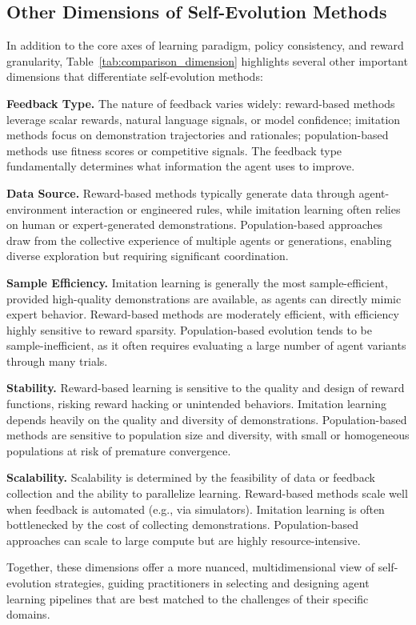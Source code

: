  

\subsection{Other Dimensions of Self-Evolution Methods}

In addition to the core axes of learning paradigm, policy consistency, and reward granularity, Table~\ref{tab:comparison_dimension} highlights several other important dimensions that differentiate self-evolution methods:

\textbf{Feedback Type.}
The nature of feedback varies widely: reward-based methods leverage scalar rewards, natural language signals, or model confidence; imitation methods focus on demonstration trajectories and rationales; population-based methods use fitness scores or competitive signals. The feedback type fundamentally determines what information the agent uses to improve.

\textbf{Data Source.}
Reward-based methods typically generate data through agent-environment interaction or engineered rules, while imitation learning often relies on human or expert-generated demonstrations. Population-based approaches draw from the collective experience of multiple agents or generations, enabling diverse exploration but requiring significant coordination.

\textbf{Sample Efficiency.}
Imitation learning is generally the most sample-efficient, provided high-quality demonstrations are available, as agents can directly mimic expert behavior. Reward-based methods are moderately efficient, with efficiency highly sensitive to reward sparsity. Population-based evolution tends to be sample-inefficient, as it often requires evaluating a large number of agent variants through many trials.

\textbf{Stability.}
Reward-based learning is sensitive to the quality and design of reward functions, risking reward hacking or unintended behaviors. Imitation learning depends heavily on the quality and diversity of demonstrations. Population-based methods are sensitive to population size and diversity, with small or homogeneous populations at risk of premature convergence.

\textbf{Scalability.}
Scalability is determined by the feasibility of data or feedback collection and the ability to parallelize learning. Reward-based methods scale well when feedback is automated (e.g., via simulators). Imitation learning is often bottlenecked by the cost of collecting demonstrations. Population-based approaches can scale to large compute but are highly resource-intensive.

Together, these dimensions offer a more nuanced, multidimensional view of self-evolution strategies, guiding practitioners in selecting and designing agent learning pipelines that are best matched to the challenges of their specific domains.
